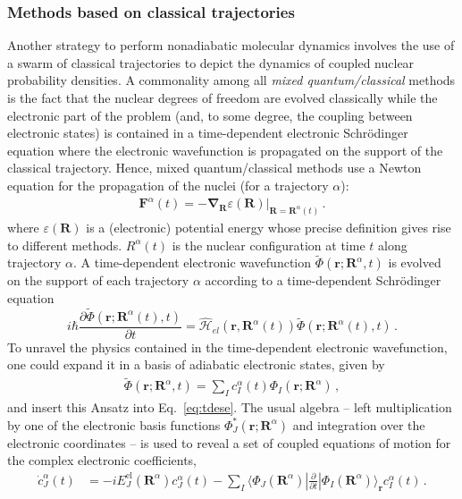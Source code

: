\documentclass[9pt,bestpractices]{livecoms}
\newcommand{\bra}[1]{\langle #1|}
\newcommand{\ket}[1]{|#1\rangle}
\newcommand{\bs}{\mathbf}
\begin{document}
\subsubsection{Methods based on classical trajectories}
\label{sec:classtrajmethod}

Another strategy to perform nonadiabatic molecular dynamics involves the use of a swarm of classical trajectories to depict the dynamics of coupled nuclear probability densities. A commonality among all \textit{mixed quantum/classical} methods is the fact that the nuclear degrees of freedom are evolved classically while the electronic part of the problem (and, to some degree, the coupling between electronic states) is contained in a time-dependent electronic Schr\"{o}dinger equation where the electronic wavefunction is propagated on the support of the classical trajectory. Hence, mixed quantum/classical methods use a Newton equation for the propagation of the nuclei (for a trajectory $\alpha$):
\begin{align}
\mathbf F^{\alpha}(t) = -\boldsymbol\nabla_{\bs R} \varepsilon(\bs R)|_{\bs R = \bs R^{\alpha}(t)} \, .
\label{eqn: quantum-classical general}
\end{align}
where $\varepsilon(\bs R)$ is a (electronic) potential energy whose precise definition gives rise to different methods. $R^{\alpha}(t)$ is the nuclear configuration at time $t$ along trajectory $\alpha$. A time-dependent electronic wavefunction $\tilde{\Phi}(\bs r; \bs R^{\alpha}, t)$ is evolved on the support of each trajectory $\alpha$ according to a time-dependent Schr\"{o}dinger equation
\begin{equation}
i \hbar \frac{\partial \tilde{\Phi}(\bs r; \bs R^\alpha(t), t)}{\partial t} = \hat{\mathcal{H}}_{el}(\bs r, \bs R^\alpha(t)) \tilde{\Phi}(\bs r; \bs R^\alpha(t), t) \, .
\label{eq:tdese}
\end{equation}
To unravel the physics contained in the time-dependent electronic wavefunction, one could expand it in a basis of adiabatic electronic states,
given by 
\begin{align}
\tilde{\Phi}(\bs r; \bs R^{\alpha}, t) = \sum_I c_I^\alpha(t) \Phi_I(\bs r; \bs R^{\alpha}) \, ,
\label{eqn: surface-hopping BH expansion}
\end{align}
and insert this Ansatz into Eq.~\eqref{eq:tdese}. The usual algebra -- left multiplication by one of the electronic basis functions $\Phi_J^\ast(\bs r; \bs R^{\alpha})$ and integration over the electronic coordinates -- is used to reveal a set of coupled equations of motion for the complex electronic coefficients, 
\begin{align}
\dot c_{J}^{\alpha}(t) &= -i  E_J^{\text{el}}\left(\bs R^{\alpha}\right)c_J^{\alpha}(t)-\sum_I  \bra{\Phi_J(\bs R^{\alpha})}\frac{\partial}{\partial t}\ket{\Phi_I(\bs R^{\alpha})}_{\mathbf{r}}  c_I^{\alpha}(t) \, .
\label{tdese_coeff_intermed}
\end{align}
\end{document}
